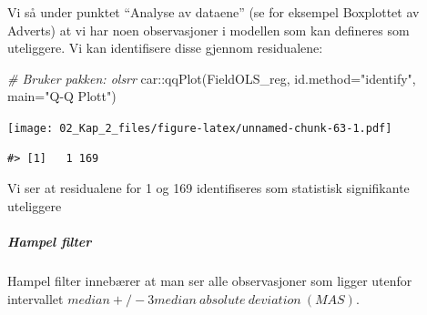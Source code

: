 \documentclass[
]{article}
\newenvironment{Shaded}{\begin{snugshade}}{\end{snugshade}}
\newcommand{\AttributeTok}[1]{\textcolor[rgb]{0.77,0.63,0.00}{#1}}
\newcommand{\CommentTok}[1]{\textcolor[rgb]{0.56,0.35,0.01}{\textit{#1}}}
\newcommand{\DecValTok}[1]{\textcolor[rgb]{0.00,0.00,0.81}{#1}}
\newcommand{\FunctionTok}[1]{\textcolor[rgb]{0.00,0.00,0.00}{#1}}
\newcommand{\NormalTok}[1]{#1}
\newcommand{\OtherTok}[1]{\textcolor[rgb]{0.56,0.35,0.01}{#1}}
\newcommand{\SpecialCharTok}[1]{\textcolor[rgb]{0.00,0.00,0.00}{#1}}
\newcommand{\StringTok}[1]{\textcolor[rgb]{0.31,0.60,0.02}{#1}}
\begin{document}
Vi så under punktet ``Analyse av dataene'' (se for eksempel Boxplottet av Adverts) at vi har noen observasjoner i modellen som kan defineres som uteliggere. Vi kan identifisere disse gjennom residualene:

\begin{Shaded}
\begin{Highlighting}[]
\CommentTok{\# Bruker pakken: olsrr}
\NormalTok{car}\SpecialCharTok{::}\FunctionTok{qqPlot}\NormalTok{(FieldOLS\_reg, }\AttributeTok{id.method=}\StringTok{"identify"}\NormalTok{, }\AttributeTok{main=}\StringTok{"Q{-}Q Plott"}\NormalTok{)}
\end{Highlighting}
\end{Shaded}

\texttt{[image: 02\_Kap\_2\_files/figure-latex/unnamed-chunk-63-1.pdf]}

\begin{verbatim}
#> [1]   1 169
\end{verbatim}

Vi ser at residualene for 1 og 169 identifiseres som statistisk signifikante uteliggere

\hypertarget{hampel-filter}{%
\subparagraph{Hampel filter}\label{hampel-filter}}

Hampel filter innebærer at man ser alle observasjoner som ligger utenfor intervallet \(median +/- 3 median\ absolute\ deviation\ (MAS)\).

\begin{Shaded}
\end{Shaded}
\end{document}
